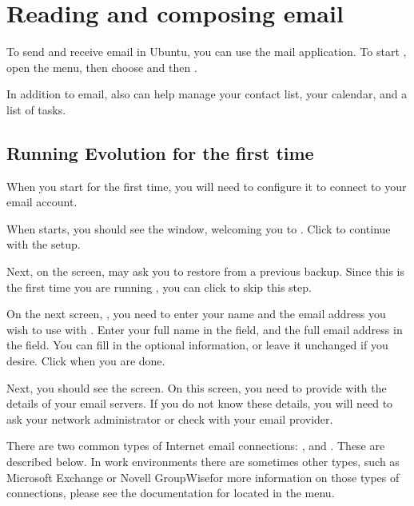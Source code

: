 \section{Reading and composing email}

To send and receive email in Ubuntu, you can use the 
mail application. To start , open the 
menu, then choose  and then .

In addition to email,  also can help manage your contact list,
your calendar, and a list of tasks.


\subsection{Running Evolution for the first time}

When you start  for the first time, you will need to configure
it to connect to your email account.

When  starts, you should see the  
window, welcoming you to . Click  
to continue with the setup.

Next, on the  screen,  may ask you to
restore from a previous backup. Since this is the first time you are 
running , you can click  to skip this
step.

On the next screen, , you need to enter your name
and the email address you wish to use with . Enter your full name
in the  field, and the full email address in the 
 field. You can fill in the optional information, 
or leave it unchanged if you desire. Click  
when you are done.

Next, you should see the  screen. On this screen,
you need to provide  with the details of your email servers. If
you do not know these details, you will need to ask your network administrator
or check with your email provider.

There are two common types of Internet email connections: , and . 
These are described below. In work environments there are sometimes other 
types, such as Microsoft Exchange or Novell GroupWise\dash for more 
information on those types of connections, please see the documentation for
 located in the  menu.

